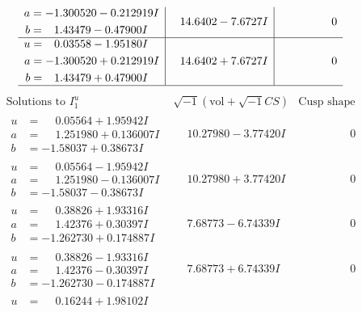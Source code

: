 \documentclass[1p]{elsarticle_modified}
\theoremstyle{definition}
\newcommand{\I}{\sqrt{-1}}
\begin{document}
$$\begin{array}{c|c|c}
\begin{aligned}
a &= -1.300520 - 0.212919 I \\
b &= \phantom{-}1.43479 - 0.47900 I\end{aligned}
 & \phantom{-}14.6402 - 7.6727 I & \phantom{-0.000000 } 0 \\ \hline\begin{aligned}
u &= \phantom{-}0.03558 - 1.95180 I \\
a &= -1.300520 + 0.212919 I \\
b &= \phantom{-}1.43479 + 0.47900 I\end{aligned}
 & \phantom{-}14.6402 + 7.6727 I & \phantom{-0.000000 } 0\\
 \hline 
 \end{array}$$\newpage$$\begin{array}{c|c|c}  
\text{Solutions to }I^u_{1}& \I (\text{vol} + \sqrt{-1}CS) & \text{Cusp shape}\\
 \hline 
\begin{aligned}
u &= \phantom{-}0.05564 + 1.95942 I \\
a &= \phantom{-}1.251980 + 0.136007 I \\
b &= -1.58037 + 0.38673 I\end{aligned}
 & \phantom{-}10.27980 - 3.77420 I & \phantom{-0.000000 } 0 \\ \hline\begin{aligned}
u &= \phantom{-}0.05564 - 1.95942 I \\
a &= \phantom{-}1.251980 - 0.136007 I \\
b &= -1.58037 - 0.38673 I\end{aligned}
 & \phantom{-}10.27980 + 3.77420 I & \phantom{-0.000000 } 0 \\ \hline\begin{aligned}
u &= \phantom{-}0.38826 + 1.93316 I \\
a &= \phantom{-}1.42376 + 0.30397 I \\
b &= -1.262730 + 0.174887 I\end{aligned}
 & \phantom{-}7.68773 - 6.74339 I & \phantom{-0.000000 } 0 \\ \hline\begin{aligned}
u &= \phantom{-}0.38826 - 1.93316 I \\
a &= \phantom{-}1.42376 - 0.30397 I \\
b &= -1.262730 - 0.174887 I\end{aligned}
 & \phantom{-}7.68773 + 6.74339 I & \phantom{-0.000000 } 0 \\ \hline\begin{aligned}
u &= \phantom{-}0.16244 + 1.98102 I \\

\end{aligned}
\end{array}$$
\end{document}
